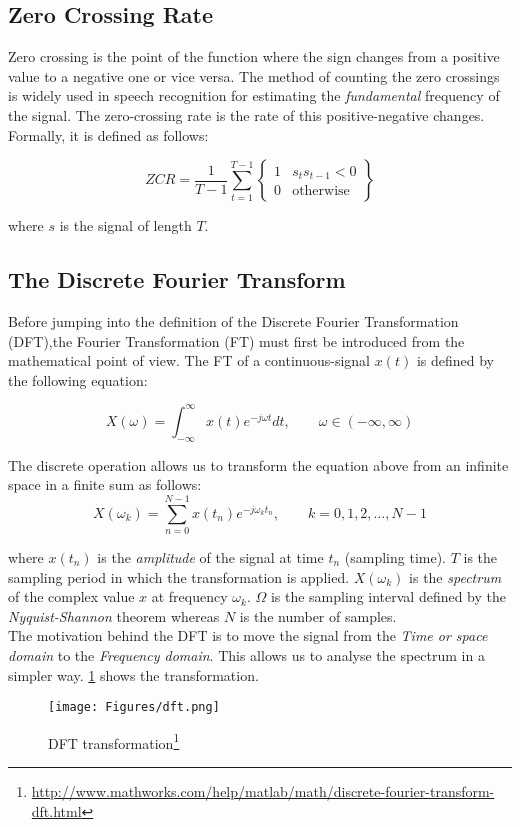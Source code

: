\subsection{Zero Crossing Rate}
\label{ssubs:Zero Crossing Rate}
Zero crossing is the point of the function where the sign changes from a positive value to a negative one or vice versa. The method of counting the zero crossings is widely used in speech recognition for estimating the \textit{fundamental} frequency of the signal. The zero-crossing rate is the rate of this positive-negative changes. Formally, it is defined as follows:

\begin{equation}
ZCR = \frac{1}{T-1} \sum_{t=1}^{T-1} \begin{Bmatrix}
										1  & s_t s_{t-1} < 0 \\
										0 & \text{otherwise}
									 \end{Bmatrix}
\end{equation}

\noindent where $s$ is the signal of length $T$.

\subsection{The Discrete Fourier Transform}
\label{ssubs:discrete_fourier_transform}
Before jumping into the definition of the Discrete Fourier Transformation (DFT),the Fourier Transformation (FT) must first be introduced from the mathematical point of view. The FT of a continuous-signal $x(t)$ is defined by the following equation:

\begin{equation}
X(\omega) = \int_{-\infty}^\infty x(t)e^{-j\omega t} dt, \qquad \omega\in(-\infty,\infty)
\end{equation}

\noindent The discrete operation allows us to transform the equation above from an infinite space in a finite sum as follows:
\begin{equation}
X(\omega_k ) = \sum_{n=0}^{N-1}x(t_n)e^{-j\omega_k t_n}, \qquad k=0,1,2,\ldots,N-1
\end{equation}

\noindent where $x(t_n)$ is the \textit{amplitude} of the signal at time $t_n$ (sampling time). $T$ is the sampling period in which the transformation is applied. $X(\omega_k )$ is the \textit{spectrum} of the complex value $x$ at frequency $\omega_k$. $\Omega$ is the sampling interval defined by the \textit{Nyquist-Shannon} theorem whereas $N$ is the number of samples. \\

\noindent The motivation behind the DFT is to move the signal from the \textit{Time or space domain} to the \textit{Frequency domain}. This allows us to analyse the spectrum in a simpler way. \ref{fig:dft} shows the transformation.

\begin{figure}[!ht]
	\centering
	\texttt{[image: Figures/dft.png]}
	\caption{DFT transformation\footnote{\url{http://www.mathworks.com/help/matlab/math/discrete-fourier-transform-dft.html}}}
	\label{fig:dft}
\end{figure}
